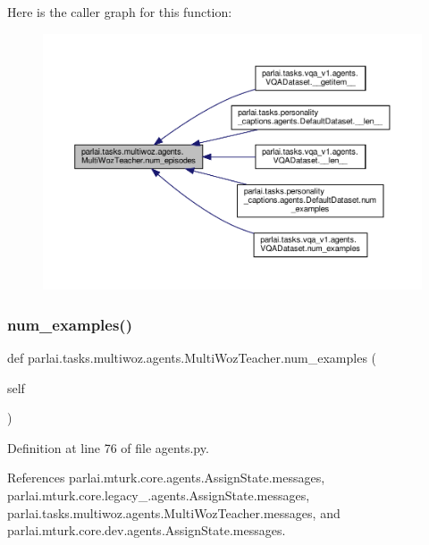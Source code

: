 Here is the caller graph for this function\+:
\nopagebreak
\begin{figure}[H]
\begin{center}
\leavevmode
\includegraphics[width=350pt]{classparlai_1_1tasks_1_1multiwoz_1_1agents_1_1MultiWozTeacher_a0b28fec07160f7a36bc820fb74baf5b2_icgraph}
\end{center}
\end{figure}
\mbox{\label{classparlai_1_1tasks_1_1multiwoz_1_1agents_1_1MultiWozTeacher_ae7ddc7d7ceb61b839b58280ddcf4b390}} 
\subsubsection{\texorpdfstring{num\+\_\+examples()}{num\_examples()}}
{\footnotesize\ttfamily def parlai.\+tasks.\+multiwoz.\+agents.\+Multi\+Woz\+Teacher.\+num\+\_\+examples (\begin{DoxyParamCaption}\item[{}]{self }\end{DoxyParamCaption})}



Definition at line 76 of file agents.\+py.



References parlai.\+mturk.\+core.\+agents.\+Assign\+State.\+messages, parlai.\+mturk.\+core.\+legacy\+\_.\+agents.\+Assign\+State.\+messages, parlai.\+tasks.\+multiwoz.\+agents.\+Multi\+Woz\+Teacher.\+messages, and parlai.\+mturk.\+core.\+dev.\+agents.\+Assign\+State.\+messages.




